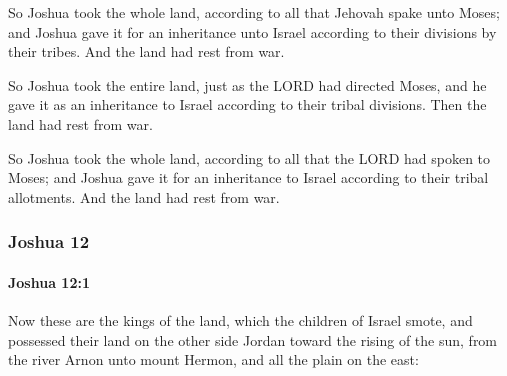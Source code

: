 			\begin{versebox}
					\item[BHS] 
					\item[ASV] So Joshua took the whole land, according to all that Jehovah spake unto Moses; and Joshua gave it for an inheritance unto Israel according to their divisions by their tribes. And the land had rest from war.
					\item[NIV] So Joshua took the entire land, just as the LORD had directed Moses, and he gave it as an inheritance to Israel according to their tribal divisions. Then the land had rest from war.
					\item[NRSV] So Joshua took the whole land, according to all that the LORD had spoken to Moses; and Joshua gave it for an inheritance to Israel according to their tribal allotments. And the land had rest from war.
			\end{versebox}
	\subsubsection{Joshua 12} %
		\label{JOSHUA-12}

		\paragraph{Joshua 12:1} %
			\label{JOSHUA-12-1}

			Now these are the kings of the land, which the children of Israel smote, and possessed their land on the other side Jordan toward the rising of the sun, from the river Arnon unto mount Hermon, and all the plain on the east:

